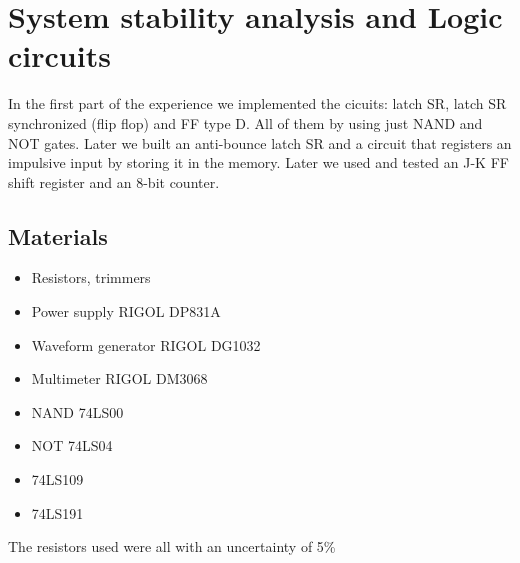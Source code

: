 \chapter{System stability analysis and Logic circuits}
In the first  part of the experience we implemented the cicuits: latch SR, latch SR synchronized (flip flop) and FF type D. All of them by using just NAND and NOT gates. Later we built an anti-bounce latch SR and a circuit that registers an impulsive input by storing it in the memory. Later we used and tested an J-K FF shift register and an 8-bit counter.

\section{Materials}
\begin{itemize}
\item Resistors, trimmers
\item Power supply RIGOL DP831A
\item Waveform generator RIGOL DG1032
\item Multimeter RIGOL DM3068
\item NAND 74LS00
\item NOT 74LS04
\item 74LS109
\item 74LS191
\end{itemize}
The resistors used were all with an uncertainty of 5\%

